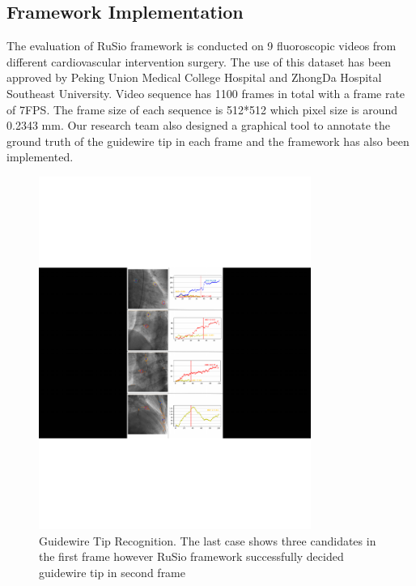 \documentclass[journal]{IEEEtran}
\begin{document}
\subsection{Framework Implementation}
The evaluation of RuSio framework is conducted on 9 fluoroscopic videos from different cardiovascular intervention surgery. The use of this dataset has been approved by Peking Union Medical College Hospital and ZhongDa Hospital Southeast University. Video sequence has 1100 frames in total with a frame rate of 7FPS. The frame size of each sequence is 512*512 which pixel size is around 0.2343 mm. Our research team also designed a graphical tool to annotate the ground truth of the guidewire tip in each frame and the framework has also been implemented. 

\begin{figure}[!htb]
	\centering  
	\includegraphics[width=3.5in]{figures/figure6}
		\caption{Guidewire Tip Recognition. The last case shows three candidates in the first frame however RuSio framework successfully decided guidewire tip in second frame} 
	\label{fig:mcmthesis-logo} 
\end{figure}
\end{document}
